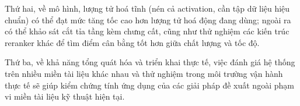 \documentclass[../DoAn.tex]{subfiles}
\begin{document}
Thứ hai, về mô hình, lượng tử hoá tĩnh (nén cả activation, cần tập dữ liệu hiệu chuẩn) có thể đạt mức tăng tốc cao hơn lượng tử hoá động đang dùng; ngoài ra có thể khảo sát cắt tỉa tầng kèm chưng cất, cũng như thử nghiệm các kiến trúc reranker khác để tìm điểm cân bằng tốt hơn giữa chất lượng và tốc độ.

Thứ ba, về khả năng tổng quát hóa và triển khai thực tế, việc đánh giá hệ thống trên nhiều miền tài liệu khác nhau và thử nghiệm trong môi trường vận hành thực tế sẽ giúp kiểm chứng tính ứng dụng của các giải pháp đề xuất ngoài phạm vi miền tài liệu kỹ thuật hiện tại.
\end{document}
